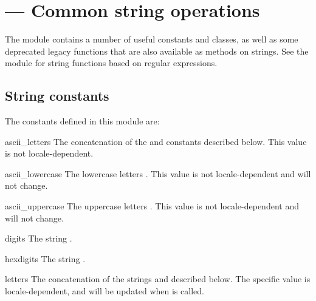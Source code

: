 \section{ ---
         Common string operations}


The  module contains a number of useful constants and classes,
as well as some deprecated legacy functions that are also available as methods
on strings.  See the module  for string
functions based on regular expressions.

\subsection{String constants}

The constants defined in this module are:

\begin{datadesc}{ascii_letters}
  The concatenation of the  and
   constants described below.  This value is
  not locale-dependent.
\end{datadesc}

\begin{datadesc}{ascii_lowercase}
  The lowercase letters .  This
  value is not locale-dependent and will not change.
\end{datadesc}

\begin{datadesc}{ascii_uppercase}
  The uppercase letters .  This
  value is not locale-dependent and will not change.
\end{datadesc}

\begin{datadesc}{digits}
  The string .
\end{datadesc}

\begin{datadesc}{hexdigits}
  The string .
\end{datadesc}

\begin{datadesc}{letters}
  The concatenation of the strings  and
   described below.  The specific value is
  locale-dependent, and will be updated when
   is called.
\end{datadesc}

